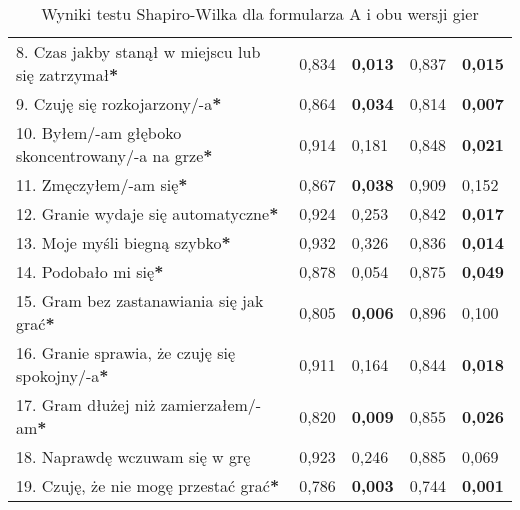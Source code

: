 \begin{table}[!h]
\begin{center}
\begin{tabular}{|m{10em}|m{5em}|m{5em}|m{5em}|m{5em}|}
            8. Czas jakby stanął w miejscu lub się zatrzymał\textbf{*}                  & 0,834                       & \textbf{0,013}   & 0,837                   & \textbf{0,015} \\
            9. Czuję się \newline rozkojarzony/-a\textbf{*}                             & 0,864                       & \textbf{0,034}   & 0,814                   & \textbf{0,007} \\
            10. Byłem/-am głęboko \newline skoncentrowany/-a \newline na grze\textbf{*} & 0,914                       & 0,181            & 0,848                   & \textbf{0,021} \\
            11. Zmęczyłem/-am się\textbf{*}                                             & 0,867                       & \textbf{0,038}   & 0,909                   & 0,152          \\
            12. Granie wydaje się automatyczne\textbf{*}                                & 0,924                       & 0,253            & 0,842                   & \textbf{0,017} \\
            13. Moje myśli \newline biegną szybko\textbf{*}                             & 0,932                       & 0,326            & 0,836                   & \textbf{0,014} \\
            14. Podobało mi się\textbf{*}                                               & 0,878                       & 0,054            & 0,875                   & \textbf{0,049} \\
            15. Gram bez zastanawiania się jak grać\textbf{*}                           & 0,805                       & \textbf{0,006}   & 0,896                   & 0,100          \\
            16. Granie sprawia, \newline że czuję się spokojny/-a\textbf{*}             & 0,911                       & 0,164            & 0,844                   & \textbf{0,018} \\
            17. Gram dłużej \newline niż zamierzałem/-am\textbf{*}                      & 0,820                       & \textbf{0,009}   & 0,855                   & \textbf{0,026} \\
            18. Naprawdę wczuwam się w grę                                              & 0,923                       & 0,246            & 0,885                   & 0,069          \\
            19. Czuję, że nie mogę przestać grać\textbf{*}                              & 0,786                       & \textbf{0,003}   & 0,744                   & \textbf{0,001} \\
            \hline
        \end{tabular}
    \end{center}
    \caption{Wyniki testu Shapiro-Wilka dla formularza A i obu wersji gier}\label{tab1:ch7_10}
\end{table}

